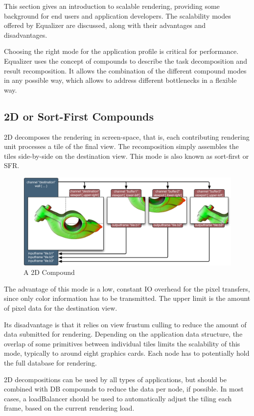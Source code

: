 \documentclass[10pt,a4]{scrartcl}
\begin{document}
This section gives an introduction to scalable rendering, providing some
background for end users and application developers. The scalability
modes offered by Equalizer are discussed, along with their advantages
and disadvantages.

Choosing the right mode for the application profile is critical for
performance. Equalizer uses the concept of compounds to describe the
task decomposition and result recomposition. It allows the combination
of the different compound modes in any possible way, which allows to
address different bottlenecks in a flexible way.


\subsection{2D or Sort-First Compounds}

2D decomposes the rendering in screen-space, that is, each contributing
rendering unit processes a tile of the final view. The recomposition
simply assembles the tiles side-by-side on the destination view. This
mode is also known as sort-first or SFR.

\begin{figure}
  \includegraphics[width=.618\textwidth]{images/2D.pdf}
  {\caption{ A 2D Compound}}
\end{figure}
The advantage of this mode is a low, constant IO overhead for the pixel
transfers, since only color information has to be transmitted. The upper
limit is the amount of pixel data for the destination view.

Its disadvantage is that it relies on view frustum culling to reduce the
amount of data submitted for rendering. Depending on the application
data structure, the overlap of some primitives between individual tiles
limits the scalability of this mode, typically to around eight graphics
cards. Each node has to potentially hold the full database for
rendering.

2D decompositions can be used by all types of applications, but should
be combined with DB compounds to reduce the data per node, if
possible. In most cases, a \textsf{loadBalancer} should be used to
automatically adjust the tiling each frame, based on the current
rendering load.
\end{document}
